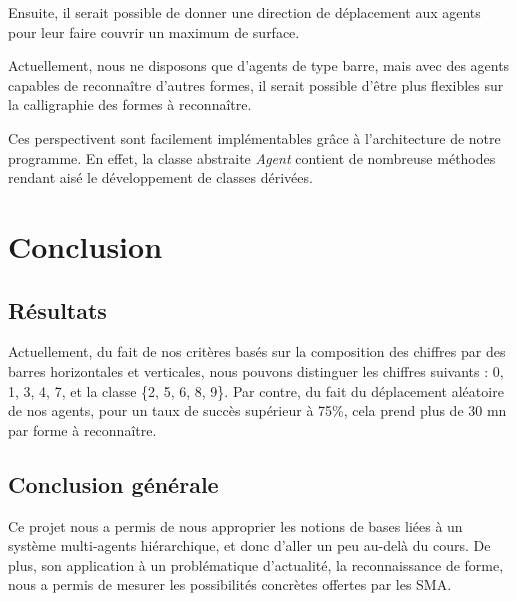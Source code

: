 \documentclass[a4paper,12pt]{report}
\begin{document}
Ensuite, il serait possible de donner une direction de déplacement aux agents pour leur faire couvrir un maximum de surface.

Actuellement, nous ne disposons que d'agents de type \og{}barre\fg{}, mais avec des agents capables de reconnaître d'autres formes, il serait possible d'être plus flexibles sur la calligraphie des formes à reconnaître.

Ces perspectivent sont facilement implémentables grâce à l'architecture de notre programme. En effet, la classe abstraite \emph{Agent} contient de nombreuse méthodes rendant aisé le développement de classes dérivées.





\chapter{Conclusion}
\section{Résultats}
Actuellement, du fait de nos critères basés sur la composition des chiffres par des barres horizontales et verticales, nous pouvons distinguer les chiffres suivants : 0, 1, 3, 4, 7, et la classe \{2, 5, 6, 8, 9\}. Par contre, du fait du déplacement aléatoire de nos agents, pour un taux de succès supérieur à 75\%, cela prend plus de 30 mn par forme à reconnaître.


\section{Conclusion générale}
Ce projet nous a permis de nous approprier les notions de bases liées à un système multi-agents hiérarchique, et donc d'aller un peu au-delà du cours. De plus, son application à un problématique d'actualité, la reconnaissance de forme, nous  a permis de mesurer les possibilités concrètes offertes par les SMA.
\end{document}
